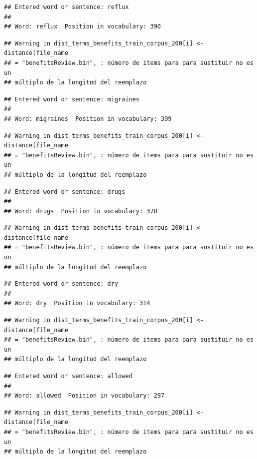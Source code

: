 \documentclass[spanish,]{article}
\begin{document}
\begin{verbatim}
## Entered word or sentence: reflux
## 
## Word: reflux  Position in vocabulary: 390
\end{verbatim}

\begin{verbatim}
## Warning in dist_terms_benefits_train_corpus_200[i] <- distance(file_name
## = "benefitsReview.bin", : número de items para para sustituir no es un
## múltiplo de la longitud del reemplazo
\end{verbatim}

\begin{verbatim}
## Entered word or sentence: migraines
## 
## Word: migraines  Position in vocabulary: 399
\end{verbatim}

\begin{verbatim}
## Warning in dist_terms_benefits_train_corpus_200[i] <- distance(file_name
## = "benefitsReview.bin", : número de items para para sustituir no es un
## múltiplo de la longitud del reemplazo
\end{verbatim}

\begin{verbatim}
## Entered word or sentence: drugs
## 
## Word: drugs  Position in vocabulary: 378
\end{verbatim}

\begin{verbatim}
## Warning in dist_terms_benefits_train_corpus_200[i] <- distance(file_name
## = "benefitsReview.bin", : número de items para para sustituir no es un
## múltiplo de la longitud del reemplazo
\end{verbatim}

\begin{verbatim}
## Entered word or sentence: dry
## 
## Word: dry  Position in vocabulary: 314
\end{verbatim}

\begin{verbatim}
## Warning in dist_terms_benefits_train_corpus_200[i] <- distance(file_name
## = "benefitsReview.bin", : número de items para para sustituir no es un
## múltiplo de la longitud del reemplazo
\end{verbatim}

\begin{verbatim}
## Entered word or sentence: allowed
## 
## Word: allowed  Position in vocabulary: 297
\end{verbatim}

\begin{verbatim}
## Warning in dist_terms_benefits_train_corpus_200[i] <- distance(file_name
## = "benefitsReview.bin", : número de items para para sustituir no es un
## múltiplo de la longitud del reemplazo
\end{verbatim}
\end{document}
